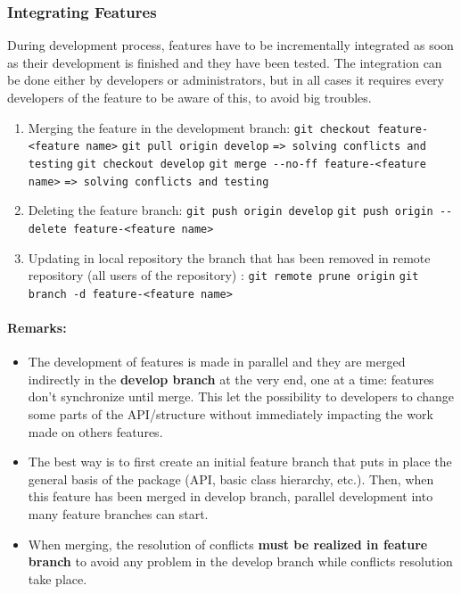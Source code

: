 \documentclass[12pt,a4paper]{article}
\begin{document}
\subsubsection{Integrating Features}

During development process, features have to be incrementally integrated as soon as their development is finished and they have been tested. The integration can be done either by developers or administrators, but in all cases it requires every developers of the feature to be aware of this, to avoid big troubles.
\begin{enumerate}
\item Merging the feature in the development branch:
\linebreak \verb|git checkout feature-<feature name>|
\linebreak \verb|git pull origin develop|
\linebreak \verb|=> solving conflicts and testing|
\linebreak \verb|git checkout develop|
\linebreak \verb|git merge --no-ff feature-<feature name>|
\linebreak \verb|=> solving conflicts and testing|
\item Deleting the feature branch:
\linebreak \verb|git push origin develop|
\linebreak \verb|git push origin --delete feature-<feature name>|
\item Updating in local repository the branch that has been removed in remote repository (all users of the repository) :
\linebreak \verb|git remote prune origin|
\linebreak \verb|git branch -d feature-<feature name>|
\end{enumerate} 

\paragraph{Remarks:}
\begin{itemize}
\item The development of features is made in parallel and they are merged indirectly in the \textbf{develop branch} at the very end, one at a time: features don't synchronize until merge. This let the possibility to developers to change some parts of the API/structure without immediately impacting the work made on others features.
\item The best way is to first create an initial feature branch that puts in place the general basis of the package (API, basic class hierarchy, etc.). Then, when this feature has been merged in develop branch, parallel development into many feature branches can start.
\item When merging, the resolution of conflicts \textbf{must be realized in feature branch} to avoid any problem in the develop branch while conflicts resolution take place.
\end{itemize}
\end{document}
